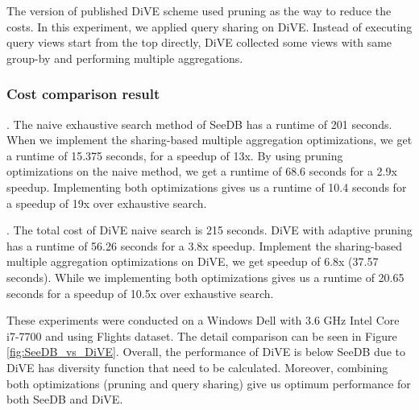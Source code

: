 \documentclass{article}
\begin{document}
The version of published DiVE scheme used pruning as the way to reduce the costs. In this experiment, we applied query sharing on DiVE. Instead of executing query views start from the top directly, DiVE collected some views with same group-by and performing multiple aggregations. 


\subsubsection{Cost comparison result}
\textit{\textbf{}}. The naive exhaustive search method of SeeDB has a runtime of 201 seconds.
When we implement the sharing-based multiple aggregation optimizations, we get a runtime of 15.375 seconds, for a speedup of 13x. By using pruning optimizations on the naive method, we get a runtime of 68.6 seconds for a 2.9x speedup. Implementing both optimizations gives us a runtime of 10.4 seconds for a speedup of 19x over exhaustive search. 

. The total cost of DiVE naive search is 215 seconds. DiVE with adaptive pruning has a runtime of 56.26 seconds for a 3.8x speedup. Implement the sharing-based multiple aggregation optimizations on DiVE, we get speedup of 6.8x (37.57 seconds). While we implementing both optimizations gives us a runtime of 20.65 seconds for a speedup of 10.5x over exhaustive search. 

These experiments were conducted on a Windows Dell with 3.6 GHz Intel Core i7-7700 and using Flights dataset. The detail comparison can be seen in Figure \ref{fig:SeeDB_vs_DiVE}. Overall, the performance of DiVE is below SeeDB due to DiVE has diversity function that need to be calculated. Moreover, combining both optimizations (pruning and query sharing) give us optimum performance for both SeeDB and DiVE. 
\end{document}

